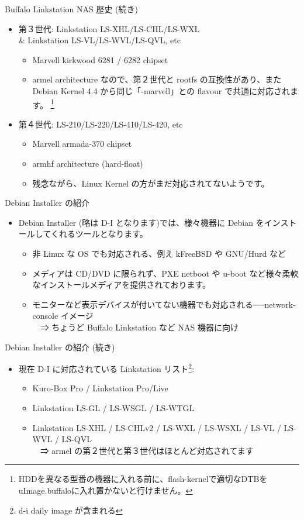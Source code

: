 \begin{frame}{Buffalo Linkstation NAS 歴史 (続き)}
\begin{itemize}
\item 第３世代: Linkstation LS-XHL/LS-CHL/LS-WXL\\
\& Linkstation LS-VL/LS-WVL/LS-QVL, etc
	\begin{itemize}
	\item Marvell kirkwood 6281 / 6282 chipset
	\item armel architecture なので、第２世代と rootfs の互換性があり、また Debian Kernel 4.4 から同じ「-marvell」との flavour で共通に対応されます。
\footnote{HDDを異なる型番の機器に入れる前に、flash-kernelで適切なDTBをuImage.buffaloに入れ置かないと行けません。}
	\end{itemize}
\item 第４世代: LS-210/LS-220/LS-410/LS-420, etc
	\begin{itemize}
	\item Marvell armada-370 chipset
	\item armhf architecture (hard-float)
	\item 残念ながら、Linux Kernel の方がまだ対応されてないようです。
	\end{itemize}
\end{itemize}
\end{frame}

\begin{frame}{Debian Installer の紹介}
\begin{itemize}
\item Debian Installer (略は D-I となります)では、様々機器に Debian をインストールしてくれるツールとなります。
	\begin{itemize}
	\item 非 Linux な OS でも対応される、例え kFreeBSD や GNU/Hurd など
	\item メディアは CD/DVD に限られず、PXE netboot や u-boot など様々柔軟なインストールメディアを提供されております。
	\item モニターなど表示デバイスが付いてない機器でも対応される──network-console イメージ\\
	　⇒ ちょうど Buffalo Linkstation など NAS 機器に向け
	\end{itemize}
\end{itemize}
\end{frame}

\begin{frame}{Debian Installer の紹介 (続き)}
\begin{itemize}
\item 現在 D-I に対応されている Linkstation リスト\footnote{d-i daily image が含まれる}:
	\begin{itemize}
	\item Kuro-Box Pro / Linkstation Pro/Live
	\item Linkstation LS-GL / LS-WSGL / LS-WTGL
	\item Linkstation LS-XHL / LS-CHLv2 / LS-WXL / LS-WSXL / LS-VL / LS-WVL / LS-QVL\\
	　⇒ armel の第２世代と第３世代はほとんど対応されてます
	\end{itemize}
\end{itemize}
\end{frame}


